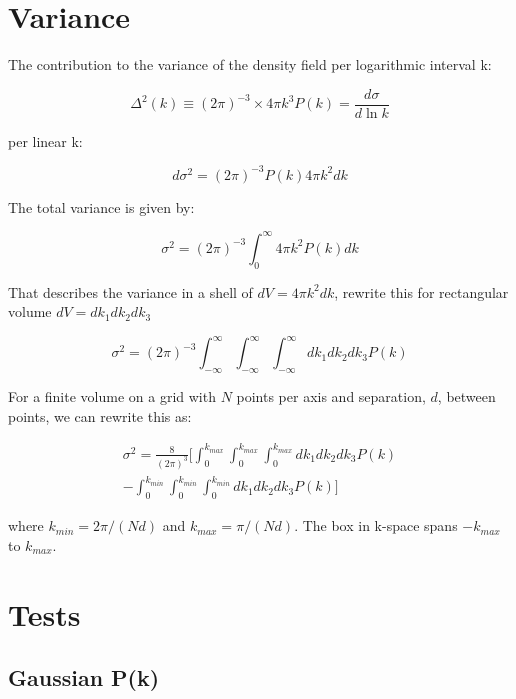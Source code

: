 \documentclass[10pt]{article}
\begin{document}
\section{Variance}

The contribution to the variance of the density field per logarithmic interval k:

\begin{equation}
\Delta^2(k) \equiv (2\pi)^{-3} \times 4\pi k^3 P(k) = \frac{d\sigma}{d\ln k}
\end{equation}

per linear k:

\begin{equation}
d \sigma^2 = (2\pi)^{-3} P(k) 4 \pi k^2 dk
\end{equation}

The total variance is given by:

\begin{equation}
\sigma^2 = (2\pi)^{-3} \int_0^{\infty} 4 \pi k^2 P(k) dk
\end{equation}

That describes the variance in a shell of $dV = 4 \pi k^2 dk$, rewrite this for rectangular volume $dV = dk_1 dk_2 dk_3$

\begin{equation}
\sigma^2 = (2\pi)^{-3} \int_{-\infty}^{\infty} \int_{-\infty}^{\infty} \int_{-\infty}^{\infty} dk_1 dk_2 dk_3 P(k)
\end{equation}

For a finite volume on a grid with $N$ points per axis and separation, $d$, between points, we can rewrite this as:

\begin{multline}
\label{var3d}
\sigma^2 = \frac{8}{(2\pi)^3} \biggl[ \int_{0}^{k_{max}} \int_{0}^{k_{max}} \int_{0}^{k_{max}} dk_1 dk_2 dk_3 P(k) \\
 - \int_{0}^{k_{min}} \int_{0}^{k_{min}} \int_{0}^{k_{min}} dk_1 dk_2 dk_3 P(k) \biggr]
\end{multline}

where $k_{min} = 2\pi/(N d) $ and $k_{max} = \pi/(N d)$. The box in k-space spans $-k_{max}$ to $k_{max}$. 

\section{Tests}

\subsection{Gaussian P(k)}
\end{document}
